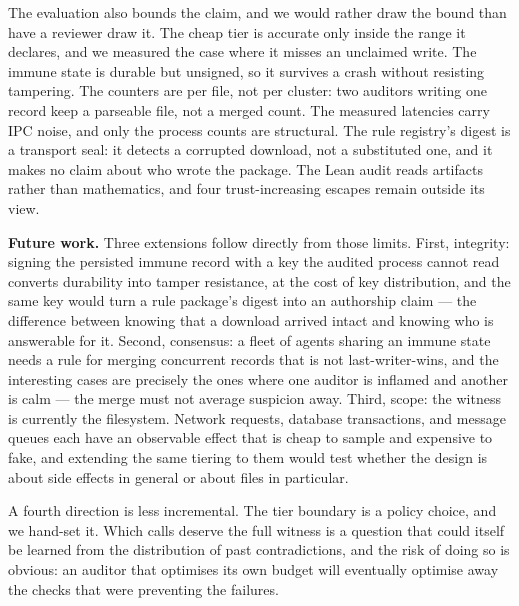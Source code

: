 \documentclass[conference]{IEEEtran}
\begin{document}
The evaluation also bounds the claim, and we would rather draw the bound than have
a reviewer draw it. The cheap tier is accurate only inside the range it declares,
and we measured the case where it misses an unclaimed write. The immune state is
durable but unsigned, so it survives a crash without resisting tampering. The
counters are per file, not per cluster: two auditors writing one record keep a
parseable file, not a merged count. The measured latencies carry IPC noise, and
only the process counts are structural. The rule registry's digest is a transport
seal: it detects a corrupted download, not a substituted one, and it makes no
claim about who wrote the package. The Lean audit reads artifacts rather than
mathematics, and four trust-increasing escapes remain outside its view.

\textbf{Future work.}
Three extensions follow directly from those limits. First, integrity: signing the
persisted immune record with a key the audited process cannot read converts
durability into tamper resistance, at the cost of key distribution, and the same
key would turn a rule package's digest into an authorship claim --- the
difference between knowing that a download arrived intact and knowing who is
answerable for it. Second,
consensus: a fleet of agents sharing an immune state needs a rule for merging
concurrent records that is not last-writer-wins, and the interesting cases are
precisely the ones where one auditor is inflamed and another is calm --- the
merge must not average suspicion away. Third, scope: the witness is currently
the filesystem. Network requests, database transactions, and message queues each
have an observable effect that is cheap to sample and expensive to fake, and
extending the same tiering to them would test whether the design is about
side effects in general or about files in particular.

A fourth direction is less incremental. The tier boundary is a policy choice, and
we hand-set it. Which calls deserve the full witness is a question that could
itself be learned from the distribution of past contradictions, and the risk of
doing so is obvious: an auditor that optimises its own budget will eventually
optimise away the checks that were preventing the failures.



\end{document}
